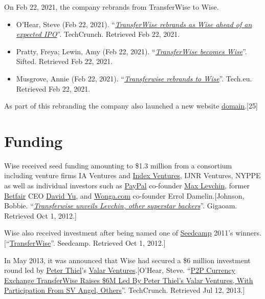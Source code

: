 \documentclass{book}
\numberwithin{equation}{section}
\begin{document}
%
On Feb 22, 2021, the company rebrands from TransferWise to Wise.
\begin{itemize}
    \item O'Hear, Steve (Feb 22, 2021). ``\href{https://techcrunch.com/2021/02/21/wise/}{\textit{TransferWise rebrands as Wise ahead of an expected IPO}}''. TechCrunch. Retrieved Feb 22, 2021.
    \item Pratty, Freya; Lewin, Amy (Feb 22, 2021). ``\href{https://sifted.eu/articles/transferwise-becomes-wise/}{\textit{TransferWise becomes Wise}}''. Sifted. Retrieved Feb 22, 2021.
    \item Musgrove, Annie (Feb 22, 2021). ``\href{https://tech.eu/brief/transferwise-rebrands-to-wise/}{\textit{Transferwise rebrands to Wise}}''. Tech.eu. Retrieved Feb 22, 2021.
\end{itemize}
As part of this rebranding the company also launched a new website \href{https://en.wikipedia.org/wiki/Domain_name}{domain}.[25]

\section{Funding}
Wise received seed funding amounting to \$1.3 million from a consortium including venture firms IA Ventures and \href{https://en.wikipedia.org/wiki/Index_Ventures}{Index Ventures}, IJNR Ventures, NYPPE as well as individual investors such as \href{https://en.wikipedia.org/wiki/PayPal}{PayPal} co-founder \href{https://en.wikipedia.org/wiki/Max_Levchin}{Max Levchin}, former \href{https://en.wikipedia.org/wiki/Betfair}{Betfair} CEO \href{https://en.wikipedia.org/wiki/David_Yu}{David Yu}, and \href{https://en.wikipedia.org/wiki/Wonga.com}{Wonga.com} co-founder Errol Damelin.[Johnson, Bobbie. ``\href{http://gigaom.com/europe/currency-startup-transferwise-unveils-superstar-backers/}{\textit{Transferwise unveils Levchin, other superstar backers}}''. Gigaoam. Retrieved Oct 1, 2012.]

%
Wise also received investment after being named one of \href{https://en.wikipedia.org/wiki/Seedcamp}{Seedcamp} 2011's winners.[``\href{http://www.seedcamp.com/companies/transferwise}{TransferWise}''. Seedcamp. Retrieved Oct 1, 2012.]

%
In May 2013, it was announced that Wise had secured a \$6 million investment round led by \href{https://en.wikipedia.org/wiki/Peter_Thiel}{Peter Thiel}'s \href{https://en.wikipedia.org/wiki/Valar_Ventures}{Valar Ventures}.[O'Hear, Steve. ``\href{https://techcrunch.com/2013/05/13/tw/}{P2P Currency Exchange TransferWise Raises \$6M Led By Peter Thiel's Valar Ventures, With Participation From SV Angel, Others}''. TechCrunch. Retrieved Jul 12, 2013.]
\end{document}
